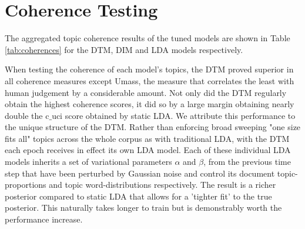 
\section{Coherence Testing}
\label{coherencetesting}

The aggregated topic coherence results of the tuned models are shown in Table \ref{tab:coherences} for the DTM, DIM and LDA models respectively.

When testing the coherence of each model's topics, the DTM proved superior in all coherence measures except Umass, the measure that correlates the least with human judgement by a considerable amount. Not only did the DTM regularly obtain the highest coherence scores, it did so by a large margin obtaining nearly double the c$\_$uci score obtained by static LDA. We attribute this performance to the unique structure of the DTM. Rather than enforcing broad sweeping "one size fits all" topics across the whole corpus as with traditional LDA, with the DTM each epoch receives in effect its own LDA model. Each of these individual LDA models inherits a set of variational parameters $\alpha$ and $\beta$, from the previous time step that have been perturbed by Gaussian noise and control its document topic-proportions and topic word-distributions respectively. The result is a richer posterior compared to static LDA that allows for a 'tighter fit' to the true posterior. This naturally takes longer to train but is demonstrably worth the performance increase.


